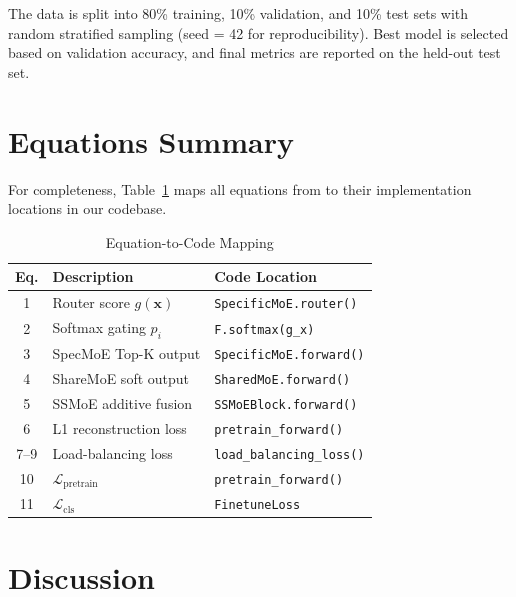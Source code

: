 \documentclass[conference]{IEEEtran}
\begin{document}
The data is split into 80\% training, 10\% validation, and 10\% test sets with random stratified sampling (seed = 42 for reproducibility). Best model is selected based on validation accuracy, and final metrics are reported on the held-out test set.

\section{Equations Summary}

For completeness, Table~\ref{tab:equations} maps all equations from \cite{eegmoe2026} to their implementation locations in our codebase.

\begin{table}[h]
\centering
\caption{Equation-to-Code Mapping}
\label{tab:equations}
\begin{tabular}{@{}cll@{}}
\toprule
\textbf{Eq.} & \textbf{Description} & \textbf{Code Location} \\
\midrule
1 & Router score $g(\mathbf{x})$ & \texttt{SpecificMoE.router()} \\
2 & Softmax gating $p_i$ & \texttt{F.softmax(g\_x)} \\
3 & SpecMoE Top-K output & \texttt{SpecificMoE.forward()} \\
4 & ShareMoE soft output & \texttt{SharedMoE.forward()} \\
5 & SSMoE additive fusion & \texttt{SSMoEBlock.forward()} \\
6 & L1 reconstruction loss & \texttt{pretrain\_forward()} \\
7--9 & Load-balancing loss & \texttt{load\_balancing\_loss()} \\
10 & $\mathcal{L}_\text{pretrain}$ & \texttt{pretrain\_forward()} \\
11 & $\mathcal{L}_\text{cls}$ & \texttt{FinetuneLoss} \\
\bottomrule
\end{tabular}
\end{table}

\section{Discussion}
\end{document}
